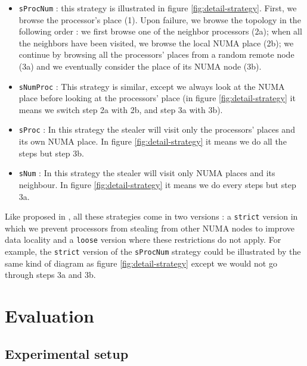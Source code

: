 \documentclass{Styles/llncs}
\begin{document}
\begin{itemize}
  \item \verb/sProcNum/ : this strategy is illustrated in figure \ref{fig:detail-strategy}.
    First, we browse the processor's place (1). Upon failure, we browse the topology in the following order : we first browse one of the neighbor processors (2a); when all the neighbors have been visited, we browse the local NUMA place (2b); we continue by browsing all the processors' places from a random remote node (3a) and we eventually consider the place of its NUMA node (3b).
  \item \verb/sNumProc/ : This strategy is similar, except we always look at the
    NUMA place before looking at the processors' place (in figure \ref{fig:detail-strategy}
    it means we switch step 2a with 2b, and step 3a with 3b).
  \item \verb/sProc/ : In this strategy the stealer will visit only the
    processors' places and its own NUMA place. In figure \ref{fig:detail-strategy} it means we do
    all the steps but step 3b.
  \item \verb/sNum/ : In this strategy the stealer will visit only NUMA places
    and its neighbour. In figure \ref{fig:detail-strategy} it means we do
    every steps but step 3a.
\end{itemize}

Like proposed in \cite{Olivier:2012:CMW:2388996.2389085}, all these strategies come in two versions : a \verb!strict! version in which we prevent processors from stealing from other NUMA nodes to improve data locality and a \verb!loose! version where these restrictions do not apply.
For example, the \verb!strict! version of the \verb!sProcNum! strategy could be illustrated by the same kind of diagram as figure \ref{fig:detail-strategy} except we would not go through steps 3a and 3b.


\section{Evaluation}
\label{sec:performances-evaluation}

\subsection{Experimental setup}
\end{document}
